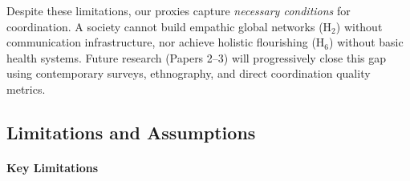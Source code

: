\documentclass[11pt]{article}
\begin{document}
Despite these limitations, our proxies capture \textit{necessary conditions}
for coordination. A society cannot build empathic global networks (H$_2$)
without communication infrastructure, nor achieve holistic flourishing (H$_6$)
without basic health systems. Future research (Papers 2--3) will progressively
close this gap using contemporary surveys, ethnography, and direct coordination
quality metrics.


\subsection{Limitations and Assumptions}
\label{sec:method-limitations}

\paragraph{Key Limitations}
\end{document}
